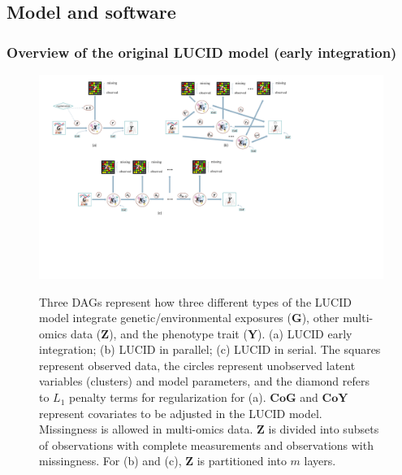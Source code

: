 \subsection{Model and software}\label{sec2}

\subsubsection{Overview of the original LUCID model (early integration)}\label{sec2.1}

\begin{figure}

{\centering \includegraphics[width=1\linewidth,alt={graphic without alt text}]{figures/fig1} 

}

\caption{Three DAGs represent how three different types of the LUCID model integrate genetic/environmental exposures ($\boldsymbol{\mathbf{G}}$), other multi-omics data ($\boldsymbol{\mathbf{Z}}$), and the phenotype trait ($\boldsymbol{\mathbf{Y}}$). (a) LUCID early integration; (b) LUCID in parallel; (c) LUCID in serial. The squares represent observed data, the circles represent unobserved latent variables (clusters) and model parameters, and the diamond refers to $L_1$ penalty terms for regularization for (a). $\boldsymbol{\mathbf{CoG}}$ and $\boldsymbol{\mathbf{CoY}}$ represent covariates to be adjusted in the LUCID model. Missingness is allowed in multi-omics data. $\boldsymbol{\mathbf{Z}}$ is divided into subsets of observations with complete measurements and observations with missingness. For (b) and (c), $\boldsymbol{\mathbf{Z}}$ is partitioned into $m$ layers.}\label{fig:fig1}
\end{figure}

